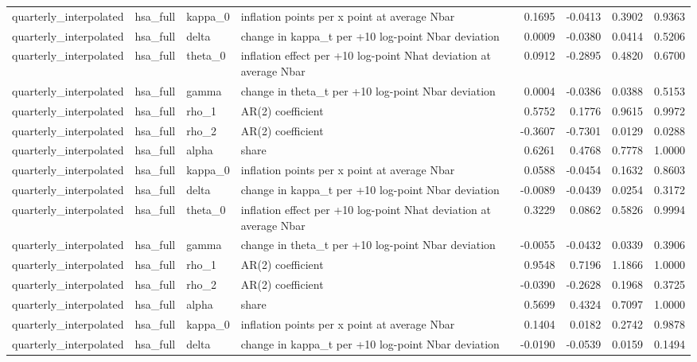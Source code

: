 \begin{tabular}{llllrrrr}
quarterly\_interpolated & hsa\_full & kappa\_0 & inflation points per x point at average Nbar & 0.1695 & -0.0413 & 0.3902 & 0.9363 \\
quarterly\_interpolated & hsa\_full & delta & change in kappa\_t per +10 log-point Nbar deviation & 0.0009 & -0.0380 & 0.0414 & 0.5206 \\
quarterly\_interpolated & hsa\_full & theta\_0 & inflation effect per +10 log-point Nhat deviation at average Nbar & 0.0912 & -0.2895 & 0.4820 & 0.6700 \\
quarterly\_interpolated & hsa\_full & gamma & change in theta\_t per +10 log-point Nbar deviation & 0.0004 & -0.0386 & 0.0388 & 0.5153 \\
quarterly\_interpolated & hsa\_full & rho\_1 & AR(2) coefficient & 0.5752 & 0.1776 & 0.9615 & 0.9972 \\
quarterly\_interpolated & hsa\_full & rho\_2 & AR(2) coefficient & -0.3607 & -0.7301 & 0.0129 & 0.0288 \\
quarterly\_interpolated & hsa\_full & alpha & share & 0.6261 & 0.4768 & 0.7778 & 1.0000 \\
quarterly\_interpolated & hsa\_full & kappa\_0 & inflation points per x point at average Nbar & 0.0588 & -0.0454 & 0.1632 & 0.8603 \\
quarterly\_interpolated & hsa\_full & delta & change in kappa\_t per +10 log-point Nbar deviation & -0.0089 & -0.0439 & 0.0254 & 0.3172 \\
quarterly\_interpolated & hsa\_full & theta\_0 & inflation effect per +10 log-point Nhat deviation at average Nbar & 0.3229 & 0.0862 & 0.5826 & 0.9994 \\
quarterly\_interpolated & hsa\_full & gamma & change in theta\_t per +10 log-point Nbar deviation & -0.0055 & -0.0432 & 0.0339 & 0.3906 \\
quarterly\_interpolated & hsa\_full & rho\_1 & AR(2) coefficient & 0.9548 & 0.7196 & 1.1866 & 1.0000 \\
quarterly\_interpolated & hsa\_full & rho\_2 & AR(2) coefficient & -0.0390 & -0.2628 & 0.1968 & 0.3725 \\
quarterly\_interpolated & hsa\_full & alpha & share & 0.5699 & 0.4324 & 0.7097 & 1.0000 \\
quarterly\_interpolated & hsa\_full & kappa\_0 & inflation points per x point at average Nbar & 0.1404 & 0.0182 & 0.2742 & 0.9878 \\
quarterly\_interpolated & hsa\_full & delta & change in kappa\_t per +10 log-point Nbar deviation & -0.0190 & -0.0539 & 0.0159 & 0.1494 \\

\end{tabular}
